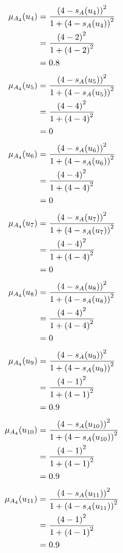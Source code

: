 \documentclass[a4paper,openany]{book}
\begin{document}
				\begin{align}
					\mu_{A_4}(u_4) &= \frac{\left(4-s_A(u_4)\right)^2}{1 + \left(4-s_A(u_4)\right)^2}\\
					&= \frac{\left(4-2\right)^2}{1 + \left(4-2\right)^2} \notag \\
					&= 0.8 \notag
				\end{align}
				\begin{align}
					\mu_{A_4}(u_5) &= \frac{\left(4-s_A(u_5)\right)^2}{1 + \left(4-s_A(u_5)\right)^2}\\
					&= \frac{\left(4-4\right)^2}{1 + \left(4-4\right)^2} \notag \\
					&= 0 \notag
				\end{align}
				\begin{align}
					\mu_{A_4}(u_6) &= \frac{\left(4-s_A(u_6)\right)^2}{1 + \left(4-s_A(u_6)\right)^2}\\
					&= \frac{\left(4-4\right)^2}{1 + \left(4-4\right)^2} \notag \\
					&= 0 \notag
				\end{align}
				\begin{align}
					\mu_{A_4}(u_7) &= \frac{\left(4-s_A(u_7)\right)^2}{1 + \left(4-s_A(u_7)\right)^2}\\
					&= \frac{\left(4-4\right)^2}{1 + \left(4-4\right)^2} \notag \\
					&= 0 \notag
				\end{align}
				\begin{align}
					\mu_{A_4}(u_8) &= \frac{\left(4-s_A(u_8)\right)^2}{1 + \left(4-s_A(u_8)\right)^2}\\
					&= \frac{\left(4-4\right)^2}{1 + \left(4-4\right)^2} \notag \\
					&= 0 \notag
				\end{align}
				\begin{align}
					\mu_{A_4}(u_9) &= \frac{\left(4-s_A(u_9)\right)^2}{1 + \left(4-s_A(u_9)\right)^2}\\
					&= \frac{\left(4-1\right)^2}{1 + \left(4-1\right)^2} \notag \\
					&= 0.9 \notag
				\end{align}
				\begin{align}
					\mu_{A_4}(u_{10}) &= \frac{\left(4-s_A(u_{10})\right)^2}{1 + \left(4-s_A(u_{10})\right)^2}\\
					&= \frac{\left(4-1\right)^2}{1 + \left(4-1\right)^2} \notag \\
					&= 0.9 \notag
				\end{align}
				\begin{align}
					\mu_{A_4}(u_{11}) &= \frac{\left(4-s_A(u_{11})\right)^2}{1 + \left(4-s_A(u_{11})\right)^2}\\
					&= \frac{\left(4-1\right)^2}{1 + \left(4-1\right)^2} \notag \\
					&= 0.9 \notag
				\end{align}
\end{document}
